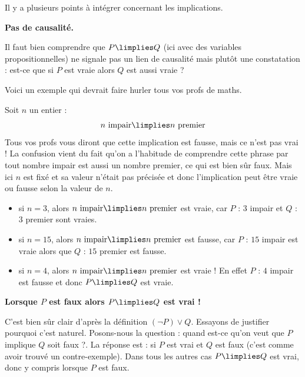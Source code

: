 \documentclass[11pt,class=report,crop=false]{standalone}
\begin{document}
Il y a plusieurs points à intégrer concernant les implications.

\medskip

\textbf{Pas de causalité.} 

Il faut bien comprendre que $P \limplies Q$ (ici avec des variables propositionnelles) ne signale pas un lien de causalité mais plutôt une constatation : est-ce que si $P$ est vraie alors $Q$ est aussi vraie ?


Voici un exemple qui devrait faire hurler tous vos profs de maths.
\begin{exemple}
 Soit $n$ un entier :
\[
n \text { impair} \limplies n \text{ premier}
\]
Tous vos profs vous diront que cette implication est fausse, mais ce n'est pas vrai !
La confusion vient du fait qu'on a l'habitude de comprendre cette phrase par \og{}tout nombre impair est aussi un nombre premier\fg{}, ce qui est bien sûr faux.
Mais ici $n$ est fixé et sa valeur n'était pas précisée et donc l'implication peut être vraie ou fausse selon la valeur de $n$.

\begin{itemize}
	\item si $n=3$, alors \og{}$n \text { impair} \limplies n \text{ premier}$\fg{} est vraie, car $P$ : \og{}$3$ impair\fg{} et $Q$ : \og{}$3$ premier\fg{} sont vraies.
	
	\item si $n=15$, alors \og{}$n \text { impair} \limplies n \text{ premier}$\fg{} est fausse, car $P$ : \og{}$15$ impair\fg{} est vraie alors que $Q$ : \og{}$15$ premier\fg{} est fausse.
	
	\item si $n=4$, alors \og{}$n \text { impair} \limplies n \text{ premier}$\fg{} est vraie ! En effet $P$ : \og{}$4$ impair\fg{} est fausse et donc $P \limplies Q$ est vraie. 
\end{itemize}


\end{exemple}


\medskip

\textbf{Lorsque $P$ est faux alors $P \limplies Q$ est vrai !}

C'est bien sûr clair d'après la définition $(\lnot P) \lor Q$.
Essayons de justifier pourquoi c'est naturel. 
Posons-nous la question : \og{}quand est-ce qu'on veut que $P$ implique $Q$ soit faux ?\fg{}. La réponse est : \og{}si $P$ est vrai et $Q$ est faux\fg{} (c'est comme avoir trouvé un contre-exemple). Dans tous les autres cas $P \limplies Q$ est vrai, donc y compris lorsque $P$ est faux.
\end{document}
